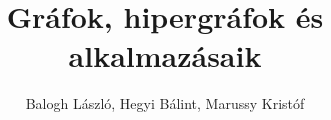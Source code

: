 \newcommand*{\authors}{Szerzők}
\newcommand*{\authori}{Balogh László}
\newcommand*{\authorii}{Hegyi Bálint}
\newcommand*{\authoriii}{Marussy Kristóf}

\newcommand*{\lecturer}{Előadó}
\newcommand*{\lectureri}{Dr.~Simonyi Gábor}

\newcommand*{\semester}{2016/2017.~tavaszi félév}

\title{Gráfok, hipergráfok és alkalmazásaik}
\newcommand*{\titlepagetitle}{Gráfok, hipergráfok\\és alkalmazásaik}
\author{\authori, \authorii, \authoriii}


